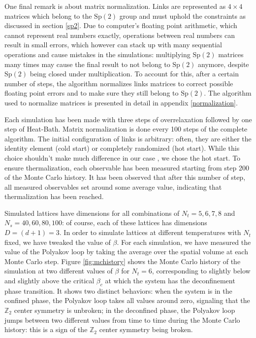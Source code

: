 \documentclass[reqno,12pt]{article}
\numberwithin{equation}{section}
\newcommand{\Sp}{\mathrm{Sp}}
\begin{document}
One final remark is about matrix normalization. Links are represented as $4 \times 4$ matrices which belong
to the $\Sp(2)$ group and must uphold the constraints as discussed in section \ref{sp2}. Due to computer's floating 
point arithmetic, which cannot represent real numbers exactly, operations between real numbers can result in small 
errors, which however can stack up with many sequential operations and cause mistakes in the simulations: multiplying
$\Sp(2)$ matrices many times may cause the final result to not belong to $\Sp(2)$ anymore, despite $\Sp(2)$ being 
closed under multiplication. To account for this, after a certain number of steps, the algorithm
normalizes links matrices to correct possible floating point errors and to make sure they still belong to $\Sp(2)$. 
The algorithm used to normalize matrices is presented in detail in appendix \ref{normalization}.

Each simulation has been made with three steps of overrelaxation followed by one step of Heat-Bath. Matrix normalization
is done every 100 steps of the complete algorithm. The initial configuration of links is arbitrary: often, they
are either the identity element (cold start) or completely randomized (hot start). While this choice
shouldn't make much difference in our case \cite{pepe}, we chose the hot start. To ensure thermalization,
each observable has been measured starting from step 200 of the Monte Carlo history. It has been observed that after 
this number of step, all measured observables set around some average value, indicating that thermalization has been
reached.

Simulated lattices have dimensions for all combinations of $N_t = 5, 6, 7, 8$ and $N_s = 40, 60, 80, 100$: of course,
each of these lattices has dimensions $D = (d+1) = 3$. In order to simulate lattices at different temperatures with
$N_t$ fixed, we have tweaked the value of $\beta$. For each simulation, we have measured the value of the Polyakov
loop by taking the average over the spatial volume at each Monte Carlo step. Figure \ref{fig:mchistory} shows
the Monte Carlo history of the simulation at two different values of $\beta$ for $N_t = 6$, 
corresponding to slightly below and slightly
above the critical $\beta_c$ at which the system has the deconfinement phase transition. It shows two distinct
behaviors: when the system is in the confined phase, the Polyakov loop takes all values around zero, signaling that
the $\mathbb{Z}_2$ center symmetry is unbroken; in the deconfined phase, the Polyakov loop jumps
between two different values from time to time during the Monte Carlo history: this is a sign of the $\mathbb{Z}_2$
center symmetry being broken. 
\end{document}
